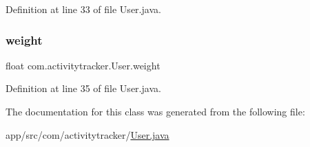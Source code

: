 Definition at line 33 of file User.\+java.

\mbox{\label{classcom_1_1activitytracker_1_1_user_a8a30c6c08983e513b462bcc035434c9e}} 
\subsubsection{\texorpdfstring{weight}{weight}}
{\footnotesize\ttfamily float com.\+activitytracker.\+User.\+weight\hspace{0.3cm}{\ttfamily [private]}}



Definition at line 35 of file User.\+java.



The documentation for this class was generated from the following file\+:\begin{DoxyCompactItemize}
\item 
app/src/com/activitytracker/\mbox{\hyperlink{_user_8java}{User.\+java}}\end{DoxyCompactItemize}
